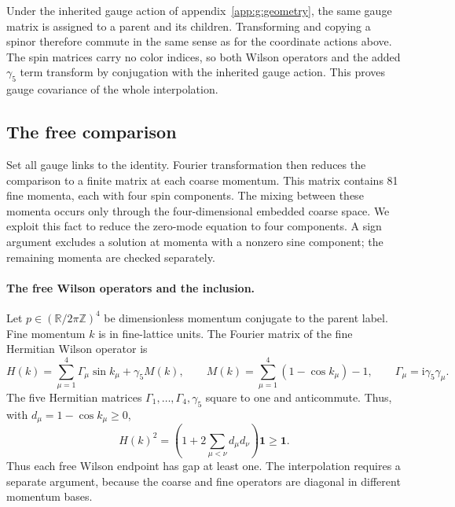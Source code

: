 \documentclass[11pt,a4paper]{article}
\theoremstyle{remark}
\newcommand{\Id}{\mathbf 1}
\newcommand{\ii}{\mathrm i}
\begin{document}
Under the inherited gauge action of appendix~\ref{app:g:geometry},
the same gauge matrix is assigned to a parent and its children. Transforming and copying
a spinor therefore commute in the same sense as for the coordinate
actions above. The spin matrices carry no color indices, so both Wilson
operators and the added $\gamma_5$ term transform by conjugation
with the inherited gauge action. This proves gauge covariance of the
whole interpolation.

\subsection{The free comparison}

Set all gauge links to the identity. Fourier transformation then reduces
the comparison to a finite matrix at each coarse momentum. This matrix
contains 81 fine momenta, each with four spin components. The mixing
between these momenta occurs only through the four-dimensional embedded
coarse space. We exploit this fact to reduce the zero-mode equation to
four components. A sign argument excludes a solution at momenta with a
nonzero sine component; the remaining momenta are checked separately.

\paragraph{The free Wilson operators and the inclusion.}
Let $p\in(\mathbb R/2\pi\mathbb Z)^4$ be dimensionless momentum
conjugate to the parent label. Fine momentum $k$ is in fine-lattice
units. The Fourier matrix of the fine Hermitian Wilson operator is
\begin{equation}
 H(k)=\sum_{\mu=1}^4\Gamma_\mu\sin k_\mu+\gamma_5 M(k),
 \qquad M(k)=\sum_{\mu=1}^4(1-\cos k_\mu)-1,
 \qquad \Gamma_\mu=\ii\gamma_5\gamma_\mu .
\end{equation}
The five Hermitian matrices
$\Gamma_1,\ldots,\Gamma_4,\gamma_5$ square to one and
anticommute. Thus, with $d_\mu=1-\cos k_\mu\ge0$,
\begin{equation}
 H(k)^2=
 \left(1+2\sum_{\mu<\nu}d_\mu d_\nu\right)\Id\ge\Id .
\end{equation}
Thus each free Wilson endpoint has gap at least one. The interpolation
requires a separate argument, because the coarse and fine operators
are diagonal in different momentum bases.
\end{document}
